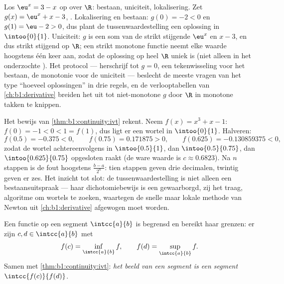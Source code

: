 \begin{example}\label{ex:b1:continuity:protocol}
Los $\eu^x = 3 - x$ op over $\R$: bestaan, uniciteit, lokalisering. Zet
$g(x) = \eu^x + x - 3$, . Lokalisering en bestaan: $g(0) = -2 < 0$
en $g(1) = \eu - 2 > 0$, dus plant de tussenwaardestelling een oplossing
in $\intoo{0}{1}$. Uniciteit: $g$ is een som van de strikt stijgende
$\eu^x$ en $x - 3$, en dus strikt stijgend op $\R$; een strikt monotone
functie neemt elke waarde hoogstens één keer aan, zodat de oplossing op
heel $\R$ uniek is (niet alleen in het onderzochte ). Het
protocol --- herschrijf tot $g = 0$, een tekenwisseling voor het bestaan,
de monotonie voor de uniciteit --- beslecht de meeste vragen van het type
``hoeveel oplossingen'' in drie regels, en de verlooptabellen van
\cref{ch:b1:derivative} breiden het uit tot niet-monotone $g$ door $\R$
in monotone takken te knippen.
\end{example}

\begin{example}\label{ex:b1:continuity:dichotomy}
Het bewijs van \cref{thm:b1:continuity:ivt} rekent. Neem $f(x) = x^3 + x
- 1$: $f(0) = -1 < 0 < 1 = f(1)$, dus ligt er een wortel in
$\intoo{0}{1}$. Halveren:
\[
f(0.5) = -0.375 < 0, \qquad
f(0.75) = 0.171875 > 0, \qquad
f(0.625) = -0.130859375 < 0 ,
\]
zodat de wortel achtereenvolgens in $\intoo{0.5}{1}$, dan
$\intoo{0.5}{0.75}$, dan $\intoo{0.625}{0.75}$ opgesloten raakt (de ware
waarde is $c \approx 0.6823$). Na $n$ stappen is de fout hoogstens
$\frac{b - a}{2^n}$: tien stappen geven drie decimalen, twintig geven er
zes. Het inzicht tot slot: de tussenwaardestelling is niet alleen een
bestaansuitspraak --- haar dichotomiebewijs is een gewaarborgd, zij het
traag, algoritme om wortels te zoeken, waartegen de snelle maar lokale
methode van Newton uit \cref{ch:b1:derivative} afgewogen moet worden.
\end{example}

\begin{theorem}[Extremumstelling]\label{thm:b1:continuity:evt}
Een  functie op een segment $\intcc{a}{b}$ is begrensd en bereikt
haar grenzen: er zijn $c, d \in \intcc{a}{b}$ met
\[
f(c) = \inf_{\intcc{a}{b}} f,
\qquad
f(d) = \sup_{\intcc{a}{b}} f .
\]
Samen met \cref{thm:b1:continuity:ivt}: \emph{het  beeld van een
segment is een segment} $\intcc{f(c)}{f(d)}$.
\end{theorem}

